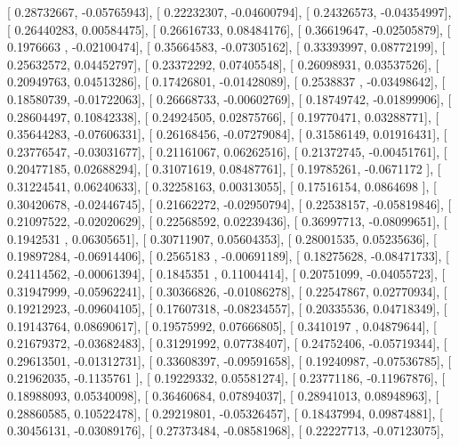 \documentclass{article}
\begin{document}
       [ 0.28732667, -0.05765943],
       [ 0.22232307, -0.04600794],
       [ 0.24326573, -0.04354997],
       [ 0.26440283,  0.00584475],
       [ 0.26616733,  0.08484176],
       [ 0.36619647, -0.02505879],
       [ 0.1976663 , -0.02100474],
       [ 0.35664583, -0.07305162],
       [ 0.33393997,  0.08772199],
       [ 0.25632572,  0.04452797],
       [ 0.23372292,  0.07405548],
       [ 0.26098931,  0.03537526],
       [ 0.20949763,  0.04513286],
       [ 0.17426801, -0.01428089],
       [ 0.2538837 , -0.03498642],
       [ 0.18580739, -0.01722063],
       [ 0.26668733, -0.00602769],
       [ 0.18749742, -0.01899906],
       [ 0.28604497,  0.10842338],
       [ 0.24924505,  0.02875766],
       [ 0.19770471,  0.03288771],
       [ 0.35644283, -0.07606331],
       [ 0.26168456, -0.07279084],
       [ 0.31586149,  0.01916431],
       [ 0.23776547, -0.03031677],
       [ 0.21161067,  0.06262516],
       [ 0.21372745, -0.00451761],
       [ 0.20477185,  0.02688294],
       [ 0.31071619,  0.08487761],
       [ 0.19785261, -0.0671172 ],
       [ 0.31224541,  0.06240633],
       [ 0.32258163,  0.00313055],
       [ 0.17516154,  0.0864698 ],
       [ 0.30420678, -0.02446745],
       [ 0.21662272, -0.02950794],
       [ 0.22538157, -0.05819846],
       [ 0.21097522, -0.02020629],
       [ 0.22568592,  0.02239436],
       [ 0.36997713, -0.08099651],
       [ 0.1942531 ,  0.06305651],
       [ 0.30711907,  0.05604353],
       [ 0.28001535,  0.05235636],
       [ 0.19897284, -0.06914406],
       [ 0.2565183 , -0.00691189],
       [ 0.18275628, -0.08471733],
       [ 0.24114562, -0.00061394],
       [ 0.1845351 ,  0.11004414],
       [ 0.20751099, -0.04055723],
       [ 0.31947999, -0.05962241],
       [ 0.30366826, -0.01086278],
       [ 0.22547867,  0.02770934],
       [ 0.19212923, -0.09604105],
       [ 0.17607318, -0.08234557],
       [ 0.20335536,  0.04718349],
       [ 0.19143764,  0.08690617],
       [ 0.19575992,  0.07666805],
       [ 0.3410197 ,  0.04879644],
       [ 0.21679372, -0.03682483],
       [ 0.31291992,  0.07738407],
       [ 0.24752406, -0.05719344],
       [ 0.29613501, -0.01312731],
       [ 0.33608397, -0.09591658],
       [ 0.19240987, -0.07536785],
       [ 0.21962035, -0.1135761 ],
       [ 0.19229332,  0.05581274],
       [ 0.23771186, -0.11967876],
       [ 0.18988093,  0.05340098],
       [ 0.36460684,  0.07894037],
       [ 0.28941013,  0.08948963],
       [ 0.28860585,  0.10522478],
       [ 0.29219801, -0.05326457],
       [ 0.18437994,  0.09874881],
       [ 0.30456131, -0.03089176],
       [ 0.27373484, -0.08581968],
       [ 0.22227713, -0.07123075],
\end{document}
